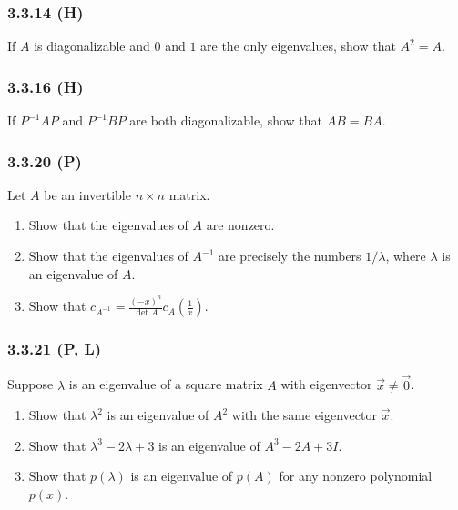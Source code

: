 \documentclass[pdf,9pt,t]{beamer}
\begin{document}
\begin{frame}[fragile]
   \frametitle{3.3.14 (H)}
   \begin{problem}
       If $A$ is diagonalizable and $0$ and $1$ are the only eigenvalues, show
       that $A^2=A$.
   \end{problem}
\end{frame}

\begin{frame}[fragile]
   \frametitle{3.3.16 (H)}
   \begin{problem}
       If $P^{-1}AP$ and $P^{-1}BP$ are both diagonalizable, show that $AB=BA$.
   \end{problem}
\end{frame}

\begin{frame}[fragile]
    \frametitle{3.3.20 (P)}
    \begin{problem}
	Let $A$ be an invertible $n\times n$ matrix.
       \begin{enumerate}
	   \item Show that the eigenvalues of $A$ are nonzero.
	   \item Show that the eigenvalues of $A^{-1}$ are precisely the numbers $1/\lambda$, where $\lambda$ is an eigenvalue of $A$.
	   \item Show that $c_{A^{-1}}=\frac{(-x)^n}{\det A}c_A\left(\frac{1}{x}\right)$.
       \end{enumerate}
    \end{problem}
\end{frame}

\begin{frame}[fragile]
    \frametitle{3.3.21 (P, L)}
    \begin{problem}
       Suppose $\lambda$ is an eigenvalue of a square matrix $A$ with eigenvector $\vec{x}\ne \vec{0}$.
       \begin{enumerate}
	   \item Show that $\lambda^2$ is an eigenvalue of $A^2$ with the same eigenvector $\vec{x}$.
	   \item Show that $\lambda^3-2\lambda+3$ is an eigenvalue of $A^3-2A+3I$.
	   \item Show that $p(\lambda)$ is an eigenvalue of $p(A)$ for any nonzero polynomial $p(x)$.
       \end{enumerate}
    \end{problem}
\end{frame}
\end{document}
